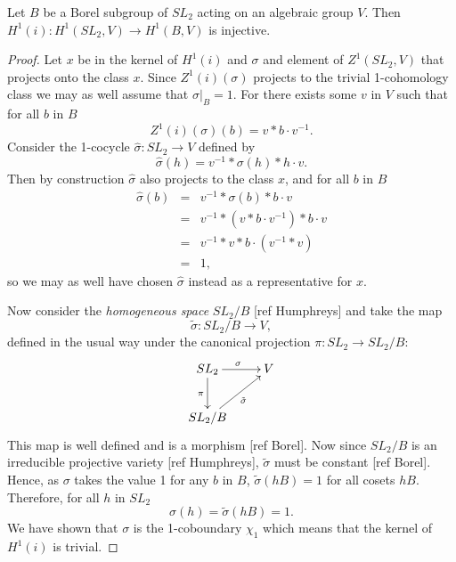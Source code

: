\begin{lemma} Let $B$ be a Borel subgroup of $SL_2$ acting on an algebraic group $V$. Then $H^1(i):H^1(SL_2, V)\rightarrow H^1(B, V)$ is injective.
\end{lemma}
\begin{proof}
Let $x$ be in the kernel of $H^1(i)$ and $\sigma$ and element of $Z^1(SL_2, V)$ that projects onto the class $x$. Since $Z^1(i)(\sigma)$ projects to the trivial 1-cohomology class we may as well assume that $\sigma|_B = 1$. For there exists some $v$ in $V$ such that for all $b$ in $B$
\begin{displaymath}
	Z^1(i)(\sigma)(b) = v*b\cdot v^{-1}.
\end{displaymath}
Consider the 1-cocycle $\hat{\sigma}:SL_2\rightarrow V$ defined by
\begin{displaymath}
	\hat{\sigma}(h) = v^{-1}*\sigma(h)*h\cdot v.
\end{displaymath}
Then by construction $\hat{\sigma}$ also projects to the class $x$, and for all $b$ in $B$
\begin{eqnarray*}
	\hat{\sigma}(b) &=& v^{-1}*\sigma(b)*b\cdot v\\
	&=& v^{-1}*(v*b\cdot v^{-1})*b\cdot v\\
	&=& v^{-1}*v*b\cdot (v^{-1} * v)\\
	&=& 1,
\end{eqnarray*}
so we may as well have chosen $\hat{\sigma}$ instead as a representative for $x$. 

Now consider the \emph{homogeneous space} $SL_2/B$ [ref Humphreys] and take the map 
\begin{displaymath}
	\tilde{\sigma}:SL_2/B \rightarrow V,
\end{displaymath}
defined in the usual way under the canonical projection $\pi:SL_2 \rightarrow SL_2/B$:
\begin{displaymath}
	\xymatrix{
	SL_2 \ar[r]^{\sigma} \ar[d]_{\pi} & V\\
	SL_2/B \ar[ru]_{\tilde{\sigma}}
	}
\end{displaymath}
This map is well defined and is a morphism [ref Borel]. Now since $SL_2/B$ is an irreducible projective variety [ref Humphreys], $\tilde{\sigma}$ must be constant [ref Borel]. Hence, as $\sigma$ takes the value 1 for any $b$ in $B$, $\tilde{\sigma}(hB) = 1$ for all cosets $hB$. Therefore, for all $h$ in $SL_2$
\begin{displaymath}
	\sigma(h) = \tilde{\sigma}(hB) = 1.
\end{displaymath}
We have shown that $\sigma$ is the 1-coboundary $\chi_1$ which means that the kernel of $H^1(i)$ is trivial.
\end{proof} 

